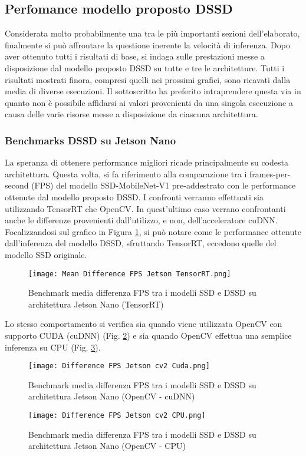 \subsection{Perfomance modello proposto DSSD}
Considerata molto probabilmente una tra le più importanti sezioni dell'elaborato, finalmente si può affrontare la questione inerente la velocità di inferenza.
Dopo aver ottenuto tutti i risultati di base, si indaga sulle prestazioni messe a disposizione dal modello proposto DSSD su tutte e tre le architetture. Tutti i risultati mostrati finora, compresi quelli nei prossimi grafici, sono ricavati dalla media di diverse esecuzioni. Il sottoscritto ha preferito intraprendere questa via in quanto non è possibile affidarsi ai valori provenienti da una singola esecuzione a causa delle varie risorse messe a disposizione da ciascuna architettura. 

\subsubsection{Benchmarks DSSD su Jetson Nano}
La speranza di ottenere performance migliori ricade principalmente su codesta architettura. Questa volta, si fa riferimento alla comparazione tra i frames-per-second (FPS) del modello SSD-MobileNet-V1 pre-addestrato con le performance ottenute dal modello proposto DSSD. I confronti verranno effettuati sia utilizzando TensorRT che OpenCV. In quest'ultimo caso verrano confrontanti anche le differenze provenienti dall'utilizzo, e non, dell'acceleratore cuDNN.
Focalizzandosi sul grafico in Figura \ref{bench-jet-tensorrt}, si può notare come le performance ottenute dall'inferenza del modello DSSD, sfruttando TensorRT, eccedono quelle del modello SSD originale.
\begin{figure}
    \centering
    \texttt{[image: Mean Difference FPS Jetson TensorRT.png]}
    \centering
    \caption{Benchmark media differenza FPS tra i modelli SSD e DSSD su architettura Jetson Nano (TensorRT)}
    \label{bench-jet-tensorrt}
\end{figure}
Lo stesso comportamento si verifica sia quando viene utilizzata OpenCV con supporto CUDA (cuDNN) (Fig. \ref{bench-jet-cv2-cudnn}) e sia quando OpenCV effettua una semplice inferenza su CPU (Fig. \ref{bench-jet-cv2-CPU}).
\begin{figure}
    \centering
    \texttt{[image: Difference FPS Jetson cv2 Cuda.png]}
    \centering
    \caption{Benchmark media differenza FPS tra i modelli SSD e DSSD su architettura Jetson Nano (OpenCV - cuDNN)}
    \label{bench-jet-cv2-cudnn}
\end{figure}
\begin{figure}
    \centering
    \texttt{[image: Difference FPS Jetson cv2 CPU.png]}
    \centering
    \caption{Benchmark media differenza FPS tra i modelli SSD e DSSD su architettura Jetson Nano (OpenCV - CPU)}
    \label{bench-jet-cv2-CPU}
\end{figure}

